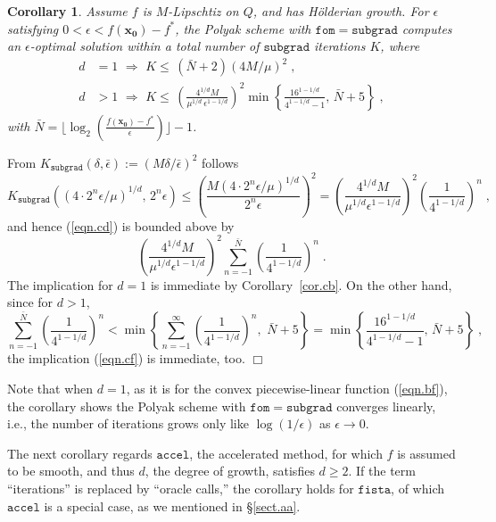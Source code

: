\documentclass[reqno, 11pt]{amsart}
\newtheorem{cor}[prop]{Corollary}
\numberwithin{equation}{section}
\newcommand{\fom}{\mathtt{fom}}
\newcommand{\subgrad}{\mathtt{subgrad}}
\newcommand{\accel}{\mathtt{accel}}
\newcommand{\fista}{\mathtt{fista}}
\begin{document}
\begin{cor}  \label{cor.cc} 
Assume $ f $ is $ M $-Lipschtiz on $ Q $, and has H\"{o}lderian growth. For $ \epsilon $ satisfying $ 0 < \epsilon < f( \mathbf{x_0}) - f^* $, the Polyak scheme with $ \fom = \subgrad $ computes an $ \epsilon $-optimal solution within a total number of $ \subgrad $ iterations $ K $, where
\begin{align}
  d & = 1 \, \,   \Rightarrow \, \, K \leq \,  (\bar{N}+2) (4 M/ \mu)^2 \; ,  \label{eqn.ce} \\
  d &> 1 \, \,  \Rightarrow \, \,  K \leq \,  \left(  \frac{ 4^{1/d} M }{\mu^{1/d} \, \epsilon^{1 - 1/d}} \right)^2 \min \left\{ \frac{ 16^{1 - 1/d}}{4^{1 - 1/d} - 1}, \, \bar{N} + 5 \right\} \; , \label{eqn.cf} 
  \end{align}
with $ \bar{N} = \lfloor \log_2 \left(  \frac{f( \mathbf{x_0}) - f^*}{\epsilon} \right) \rfloor - 1 $.  
 \end{cor}
From $ K_{\subgrad}(\delta, \bar{\epsilon}  ) :=   (M \delta/ \bar{\epsilon} )^2  $ follows
\[  
    K_{\subgrad} \left( (4 \cdot 2^n \epsilon/\mu)^{1/d}, \, 2^n \epsilon \right)  \leq  \left(  \frac{M (4 \cdot 2^n \epsilon/ \mu )^{1/d}}{2^n \epsilon} \right)^2 = \left( \frac{ 4^{1/d} M }{\mu^{1/d} \epsilon^{1 - 1/d}} \right)^2   \left( \frac{1}{ 4^{1 - 1/d}} \right)^n \; , 
\]
and hence (\ref{eqn.cd})   is bounded above by
\[ 
 \left( \frac{ 4^{1/d} M }{\mu^{1/d} \epsilon^{1 - 1/d}} \right)^2  \sum_{n=-1}^{\bar{N}} \left( \frac{1}{ 4^{1 - 1/d}} \right)^n \; . 
\]  The implication for $ d = 1 $ is immediate by Corollary~\ref{cor.cb}. On the other hand, since for $ d > 1 $, 
\[  
  \sum_{n=-1}^{\bar{N}} \left( \frac{1}{ 4^{1 - 1/d}} \right)^n < 
 \min \left\{ \sum_{n=-1}^{\infty} \left( \frac{1}{ 4^{1 - 1/d}} \right)^n, \, \, \bar{N} + 5  \right\} 
 =   \min 
  \left\{ \frac{ 16^{1 - 1/d}}{4^{1 - 1/d} - 1}, \, \bar{N} + 5 \right\} \; ,  
\]  
the implication (\ref{eqn.cf})  is immediate, too. 
 \hfill $ \Box $
\vspace{2mm}

 Note that when $ d = 1 $, as it is for the convex piecewise-linear function (\ref{eqn.bf}), the corollary shows the Polyak scheme with $ \fom = \subgrad $ converges linearly, i.e., the number of iterations grows only like $ \log(1/\epsilon) $ as $ \epsilon \rightarrow 0 $.

The next corollary regards $ \accel $, the accelerated method, for which $ f $ is assumed to be smooth, and thus $ d $, the degree of growth, satisfies $ d \geq 2 $. If the term ``iterations'' is replaced by ``oracle calls,'' the corollary holds for $ \fista $, of which $ \accel $ is a special case, as we mentioned in \S\ref{sect.aa}.
\end{document}
